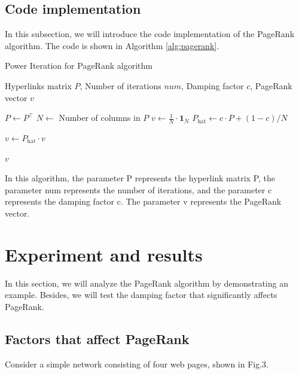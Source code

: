 \documentclass[lettersize,journal,12pt,conference]{IEEEtran}
\begin{document}
\subsection{Code implementation}

In this subsection, we will introduce the code implementation of the PageRank algorithm. The code is shown in Algorithm \ref{alg:pagerank}.

\begin{algorithm}
	\caption{Power Iteration for PageRank algorithm}
	\label{alg:pagerank}
	\begin{algorithmic}[1]
	
	\REQUIRE Hyperlinks matrix $P$, Number of iterations $num$, Damping factor $c$, PageRank vector $v$
	
	\STATE $P \gets P^\top$ 
	\STATE $N \gets$ Number of columns in $P$
	\STATE $v \gets \frac{1}{N} \cdot \mathbf{1}_N$ 
	\STATE $P_{\text{hat}} \gets c \cdot P + (1 - c) / N$ 

		\STATE $v \gets P_{\text{hat}} \cdot v$ 
	\ENDFOR
	
	\RETURN $v$
	
	\end{algorithmic}
\end{algorithm}

In this algorithm, the parameter P represents the hyperlink matrix P, the parameter num represents the number of iterations, and the parameter c represents the damping factor c. The parameter v represents the PageRank vector.

\section{Experiment and results}

In this section, we will analyze the PageRank algorithm by demonstrating an example. Besides, we will test the damping factor that significantly affects PageRank.

\subsection{Factors that affect PageRank}

Consider a simple network consisting of four web pages, shown in Fig.3.
\end{document}

